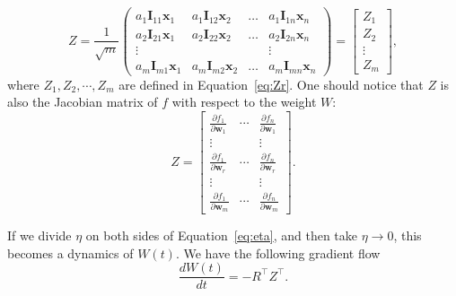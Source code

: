 \documentclass[letterpaper,12pt]{article}
\begin{document}
\begin{equation}\label{eq:Z}
Z=\frac{1}{\sqrt{m}}\left(\begin{array}{cccc}
a_{1} \mathbf{I}_{11} \mathbf{x}_{1} & a_{1} \mathbf{I}_{12} \mathbf{x}_{2} & \ldots & a_{1} \mathbf{I}_{1 n} \mathbf{x}_{n} \\
a_{2} \mathbf{I}_{21} \mathbf{x}_{1} & a_{2} \mathbf{I}_{22} \mathbf{x}_{2} & \ldots & a_{2} \mathbf{I}_{2 n} \mathbf{x}_{n} \\
\vdots & & & \vdots \\
a_{m} \mathbf{I}_{m 1} \mathbf{x}_{1} & a_{m} \mathbf{I}_{m 2} \mathbf{x}_{2} & \ldots & a_{m} \mathbf{I}_{m n} \mathbf{x}_{n}
\end{array}\right)=\left[\begin{array}{c}Z_1\\ Z_2\\\vdots\\Z_m\end{array}\right],
\end{equation}
where $Z_1, Z_2, \cdots, Z_m$ are defined in Equation~\eqref{eq:Zr}. One should notice that $Z$ is also the Jacobian matrix of $f$ with respect to the weight $W$:
\begin{equation}
    Z=\left[\begin{array}{ccc}
\frac{\partial f_{1}}{\partial \mathbf{w}_{1}} & \cdots & \frac{\partial f_{n}}{\partial \mathbf{w}_{1}} \\
\vdots&&\vdots\\
\frac{\partial f_{1}}{\partial \mathbf{w}_{r}} & \cdots & \frac{\partial f_{n}}{\partial \mathbf{w}_{r}} \\
\vdots&&\vdots\\
\frac{\partial f_{1}}{\partial \mathbf{w}_{m}} & \cdots & \frac{\partial f_{n}}{\partial \mathbf{w}_{m}}
\end{array}\right].
\end{equation}

If we divide $\eta$ on both sides of Equation~\eqref{eq:eta}, and then take $\eta\rightarrow 0$, this becomes a dynamics of $W(t)$. We have the following gradient flow
\begin{equation}
   \frac{dW(t)}{dt}= -R^{\top} Z^{\top} .
\end{equation}
\end{document}
